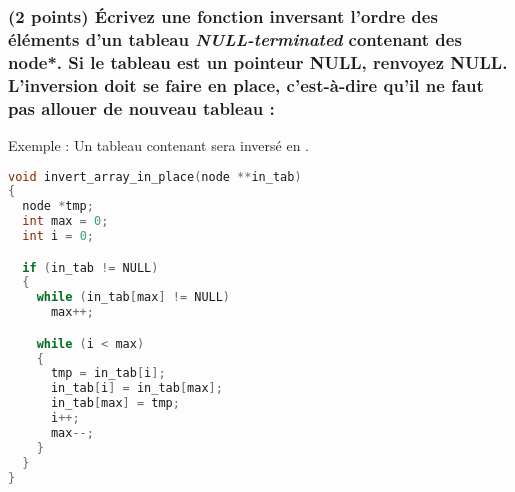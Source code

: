 \documentclass[11pt,a4paper]{article}
\begin{document}
%
%
%
%
%
%
%
%




\subsubsection{(2 points) \'Ecrivez une fonction inversant l'ordre des éléments d'un tableau \textit{NULL-terminated} contenant des node*. Si le tableau est un pointeur NULL, renvoyez NULL. L'inversion doit se faire en place, c'est-à-dire qu'il ne faut pas allouer de nouveau tableau : }

\setlength\fboxrule{0.2pt}
\noindent Exemple : Un tableau contenant  sera inversé en .
\setlength\fboxrule{0.4pt}

%

\begin{center}
\begin{lstlisting}[language=C]
void invert_array_in_place(node **in_tab)
{
  node *tmp;
  int max = 0;
  int i = 0;

  if (in_tab != NULL)
  {
    while (in_tab[max] != NULL)
      max++;

    while (i < max)
    {
      tmp = in_tab[i];
      in_tab[i] = in_tab[max];
      in_tab[max] = tmp;
      i++;
      max--;
    }
  }
}
\end{lstlisting}
\end{center}
\end{document}
